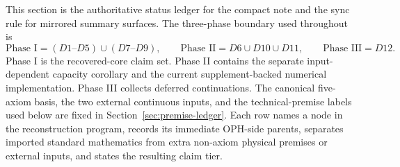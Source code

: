 \documentclass[11pt]{article}
\begin{document}
This section is the authoritative status ledger for the compact note and the sync rule for mirrored summary surfaces. The three-phase boundary used throughout is
\[
\text{Phase I}=(D1\text{--}D5)\cup(D7\text{--}D9),\qquad
\text{Phase II}=D6\cup D10\cup D11,\qquad
\text{Phase III}=D12.
\]
Phase I is the recovered-core claim set. Phase II contains the separate input-dependent capacity corollary and the current supplement-backed numerical implementation. Phase III collects deferred continuations. The canonical five-axiom basis, the two external continuous inputs, and the technical-premise labels used below are fixed in Section~\ref{sec:premise-ledger}. Each row names a node in the reconstruction program, records its immediate OPH-side parents, separates imported standard mathematics from extra non-axiom physical premises or external inputs, and states the resulting claim tier.
\end{document}
